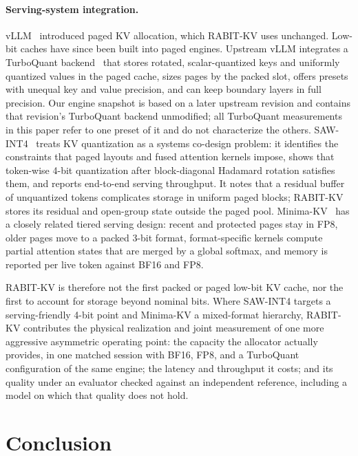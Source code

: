 \documentclass{article}
\begin{document}
\paragraph{Serving-system integration.}
vLLM~\citep{kwon2023vllm} introduced paged KV allocation, which RABIT-KV uses unchanged. Low-bit caches
have since been built into paged engines. Upstream vLLM integrates a TurboQuant backend~\citep{vllm2026turboquant}
that stores rotated, scalar-quantized keys and uniformly quantized values in the paged cache, sizes
pages by the packed slot, offers presets with unequal key and value precision, and can keep boundary
layers in full precision. Our engine snapshot is based on a later upstream revision and contains
that revision's TurboQuant backend unmodified; all TurboQuant measurements in this paper refer to one
preset of it and do not characterize the others.
SAW-INT4~\citep{jia2026sawint4} treats KV quantization as a systems co-design problem: it identifies the
constraints that paged layouts and fused attention kernels impose, shows that token-wise 4-bit
quantization after block-diagonal Hadamard rotation satisfies them, and reports end-to-end serving
throughput. It notes that a residual buffer of unquantized tokens complicates storage in uniform
paged blocks; RABIT-KV stores its residual and open-group state outside the paged pool.
Minima-KV~\citep{kozyrev2026minimakv} has a closely related tiered serving design: recent and protected
pages stay in FP8,
older pages move to a packed 3-bit format, format-specific kernels compute partial attention states
that are merged by a global softmax, and memory is reported per live token against BF16 and FP8.

RABIT-KV is therefore not the first packed or paged low-bit KV cache, nor the first to account for
storage beyond nominal bits. Where SAW-INT4 targets a serving-friendly 4-bit point and Minima-KV a
mixed-format hierarchy, RABIT-KV contributes the physical realization and joint measurement of one more
aggressive asymmetric operating point: the capacity the allocator actually provides, in one matched session with
BF16, FP8, and a TurboQuant configuration of the same engine; the latency and throughput it costs; and
its quality under an evaluator checked against an independent reference, including a model on which
that quality does not hold.

\section{Conclusion}
\label{sec:conclusion}
\end{document}
